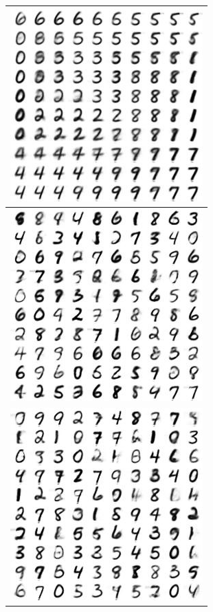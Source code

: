 \documentclass[letterpaper, twoside]{article}
\begin{document}
\begin{figure}[H]
\begin{minipage}{.33\textwidth}
\begin{flushleft}
\begin{tabular}{|@{}c@{}|}
\end{tabular}
\end{flushleft}
\end{minipage}%
\begin{minipage}{.33\textwidth}
\begin{tabular}{|@{}c@{}|}\hline
\includegraphics[scale=1]{manifold_132.jpg}\\ \hline
\includegraphics[scale=1]{manifold_133.jpg}\\ \hline
\includegraphics[scale=1]{manifold_134.jpg}\\ \hline
\end{tabular}
\end{minipage}


\end{figure}
\end{document}
